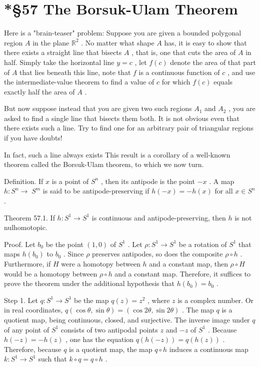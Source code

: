 \documentclass[10pt]{article}
\begin{document}
\section*{*§57 The Borsuk-Ulam Theorem}

Here is a "brain-teaser" problem: Suppose you are given a bounded polygonal region \(A\) in the plane \({\mathbb{R}}^{2}\) . No matter what shape \(A\) has, it is easy to show that there exists a straight line that bisects \(A\) , that is, one that cuts the area of \(A\) in half. Simply take the horizontal line \(y = c\) , let \(f\left( c\right)\) denote the area of that part of \(A\) that lies beneath this line, note that \(f\) is a continuous function of \(c\) , and use the intermediate-value theorem to find a value of \(c\) for which \(f\left( c\right)\) equals exactly half the area of \(A\) .

But now suppose instead that you are given two such regions \({A}_{1}\) and \({A}_{2}\) , you are asked to find a single line that bisects them both. It is not obvious even that there exists such a line. Try to find one for an arbitrary pair of triangular regions if you have doubts!

In fact, such a line always exists This result is a corollary of a well-known theorem called the Borsuk-Ulam theorem, to which we now turn.

Definition. If \(x\) is a point of \({S}^{n}\) , then its antipode is the point \(- x\) . A map \(h : {S}^{n} \rightarrow \; {S}^{m}\) is said to be antipode-preserving if \(h\left( {-x}\right)  =  - h\left( x\right)\) for all \(x \in  {S}^{n}\) .

Theorem 57.1. If \(h : {S}^{1} \rightarrow  {S}^{1}\) is continuous and antipode-preserving, then \(h\) is not nulhomotopic.

Proof. Let \({b}_{0}\) be the point \(\left( {1,0}\right)\) of \({S}^{1}\) . Let \(\rho  : {S}^{1} \rightarrow  {S}^{1}\) be a rotation of \({S}^{1}\) that maps \(h\left( {b}_{0}\right)\) to \({b}_{0}\) . Since \(\rho\) preserves antipodes, so does the composite \(\rho  \circ  h\) . Furthermore, if \(H\) were a homotopy between \(h\) and a constant map, then \(\rho  \circ  H\) would be a homotopy between \(\rho  \circ  h\) and a constant map. Therefore, it suffices to prove the theorem under the additional hypothesis that \(h\left( {b}_{0}\right)  = {b}_{0}\) .

Step 1. Let \(q : {S}^{1} \rightarrow  {S}^{1}\) be the map \(q\left( z\right)  = {z}^{2}\) , where \(z\) is a complex number. Or in real coordinates, \(q\left( {\cos \theta ,\sin \theta }\right)  = \left( {\cos {2\theta },\sin {2\theta }}\right)\) . The map \(q\) is a quotient map, being continuous, closed, and surjective. The inverse image under \(q\) of any point of \({S}^{1}\) consists of two antipodal points \(z\) and \(- z\) of \({S}^{1}\) . Because \(h\left( {-z}\right)  =  - h\left( z\right)\) , one has the equation \(q\left( {h\left( {-z}\right) }\right)  = q\left( {h\left( z\right) }\right)\) . Therefore, because \(q\) is a quotient map, the map \(q \circ  h\) induces a continuous map \(k : {S}^{1} \rightarrow  {S}^{1}\) such that \(k \circ  q = q \circ  h\) .
\end{document}
